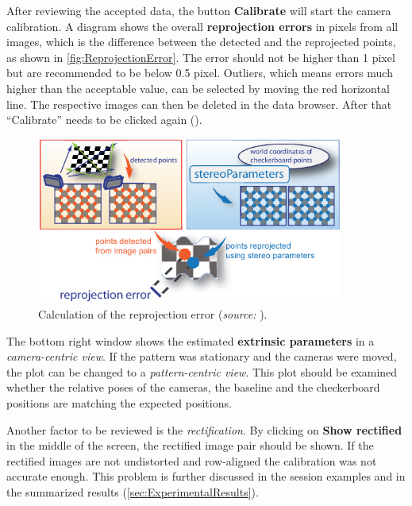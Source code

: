 After reviewing the accepted data, the button \textbf{Calibrate} will start the camera calibration. A diagram shows the overall \textbf{reprojection errors} in pixels from all images, which is the difference between the detected and the reprojected points, as shown in \autoref{fig:ReprojectionError}. The error should not be higher than 1 pixel but are recommended to be below 0.5 pixel. Outliers, which means errors much higher than the acceptable value, can be selected by moving the red horizontal line. The respective images can then be deleted in the data browser. After that \enquote{Calibrate} needs to be clicked again (\cite{StereoCalib.2016}).

\begin{figure}[htbp]
		\centering
		\includegraphics[width=0.9\textwidth]{figures/ReprojectionError}
		\caption[Calculation of the reprojection error]{Calculation of the reprojection error (\textit{source:} \cite{StereoCalib.2016}).}
		\label{fig:ReprojectionError}
\end{figure}

The bottom right window shows the estimated \textbf{extrinsic parameters} in a \textit{camera-centric view}. If the pattern was stationary and the cameras were moved, the plot can be changed to a \textit{pattern-centric view}. This plot should be examined whether the relative poses of the cameras, the baseline and the checkerboard positions are matching the expected positions. 

Another factor to be reviewed is the \textit{rectification}. By clicking on \textbf{Show rectified} in the middle of the screen, the rectified image pair should be shown. If the rectified images are not undistorted and row-aligned the calibration was not accurate enough. This problem is further discussed in the session examples and in the summarized results (\autoref{sec:ExperimentalResults}).

